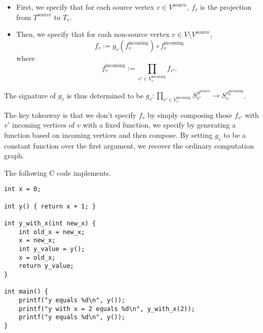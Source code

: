 \documentclass{article}
\begin{document}
\begin{itemize}
	\item First, we specify that for each source vertex $v\in V^{\text{source}}$, $f_v$ is the projection from $T^{\text{source}}$ to $T_v$.
	\item Then, we specify that for each non-source vertex $v\in V\setminus V^{\text{source}}$,
	      \begin{equation}
		      f_v:=g_v(f^{\text{incoming}}_v)\circ f^{\text{incoming}}_v
	      \end{equation}
	      where
	      \begin{equation}
		      f^{\text{incoming}}_v:=\prod_{v'\in V^{\text{incoming}}_v}f_{v'}.
	      \end{equation}
\end{itemize}

The signature of $g_v$ is thus determined to be $g_v:\prod\limits_{v'\in V^{\text{incoming}}_{v}}S_{v'}^{S^{\text{source}} }\rightarrow  S_v^{S^{\text{incoming}}_v}$.

The key takeaway is that we don't specify $f_v$ by simply composing those $f_{v'}$ with $v'$ incoming vertices of $v$ with a fixed function, we specify by generating a function based on incoming vertices and then compose. By setting $g_v$ to be a constant function over the first argument, we recover the ordinary computation graph.

The following C code implements.
\begin{verbatim}
int x = 0;

int y() { return x + 1; }

int y_with_x(int new_x) {
	int old_x = new_x;
	x = new_x;
	int y_value = y();
	x = old_x;
	return y_value;
}

int main() {
	printf("y equals %d\n", y());
	printf("y with x = 2 equals %d\n", y_with_x(2));
	printf("y equals %d\n", y());
}
\end{verbatim}

\end{document}
